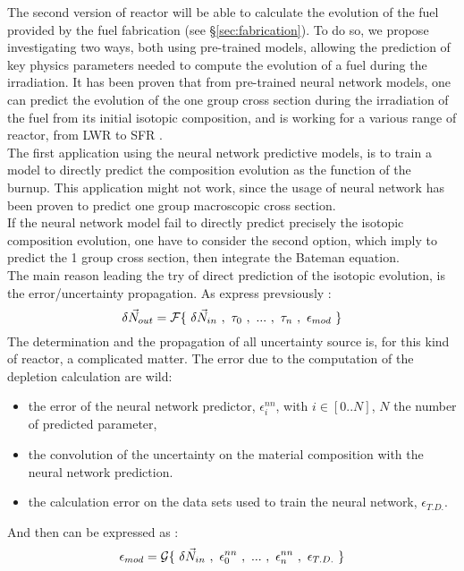 \documentclass[dvips,12pt]{article}
\begin{document}

The second version of reactor will be able to calculate the evolution of the fuel provided by the fuel fabrication (see \S \ref{sec:fabrication}).
To do so, we propose investigating two ways, both using pre-trained models, allowing the prediction of key physics parameters needed to compute the evolution of a fuel during the irradiation. It has been proven that from pre-trained neural network models, one can predict the evolution of the one group cross section during the irradiation of the fuel from its initial isotopic composition, and is working for a various range of reactor, from LWR to SFR \cite{Leniau Neural networks, Leniau.PHYSOR.2016}.\\
The first application using the neural network predictive models, is to train a model to directly predict the composition evolution as the function of the burnup. This application might not work, since the usage of neural network has been proven to predict one group macroscopic cross section.\\
If the neural network model fail to directly predict precisely the isotopic composition evolution, one have to consider the second option, which imply to predict the 1 group cross section, then integrate the Bateman equation.\\

The main reason leading the try of direct prediction of the isotopic evolution, is the error/uncertainty propagation. As express prevsiously :\begin{equation}
\delta \vec{N}_{out} = {\cal F}\{~\delta\vec{N}_{in}~,~\tau_0~,~...~,~\tau_n~,~\epsilon_{mod}~\}
\end{equation}
The determination and the propagation of all uncertainty source is, for this kind of reactor, a complicated matter. The error due to the computation of the depletion calculation are wild:
\begin{itemize}
\item the error of the neural network predictor, $\epsilon^{nn}_{i}$, with $i\in[0..N]$, $N$ the number of predicted parameter, 
\item the convolution of the uncertainty on the material composition with the neural network prediction. 
\item the calculation error on the data sets used to train the neural network, $\epsilon_{T.D.}$.
\end{itemize}
And then can be expressed as :
\begin{equation}
\epsilon_{mod} = {\cal G}\{~\delta\vec{N}_{in}~,~\epsilon^{nn}_{0}~,~...~,~\epsilon^{nn}_{n}~,~\epsilon_{T.D.}~\}
\end{equation}
\end{document}
